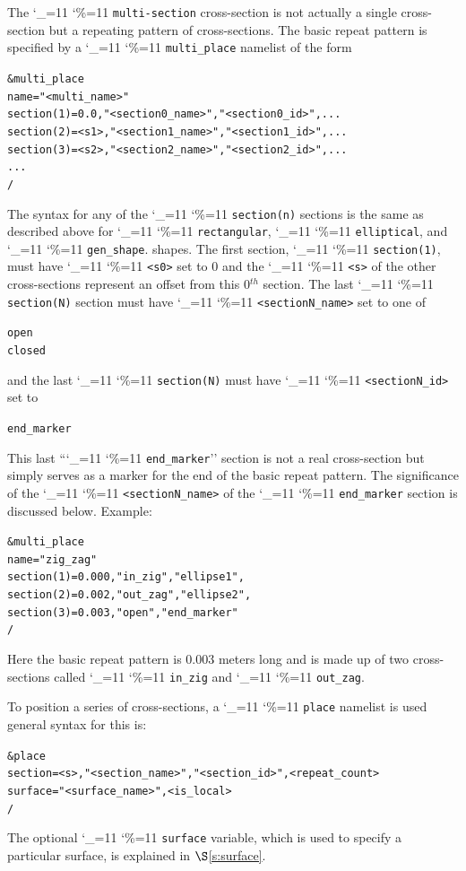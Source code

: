 \documentclass[11pt,openany]{report}
\newcommand{\sref}[1]{$\S$\ref{#1}}
\newcommand\ttcmd{\begingroup\catcode`\_=11 \catcode`\%=11 \dottcmd}
\newcommand\dottcmd[1]{\texttt{#1}\endgroup}
\newcommand{\vn}{\ttcmd}
\newcommand{\Th}{$^{th}$\xspace}
\newlength{\ExBeg}
\newlength{\ExEnd}
\newenvironment{example}
  {\vspace{\ExBeg} \begin{alltt}}
  {\end{alltt} \vspace{\ExEnd}}
\begin{document}
The \vn{multi-section} cross-section is not actually a single
cross-section but a repeating pattern of cross-sections. The basic
repeat pattern is specified by a \vn{multi_place} namelist of
the form
\begin{example}
  &multi_place
    name = "<multi_name>"
    section(1) = 0.0,  "<section0_name>", "<section0_id>", ...
    section(2) = <s1>, "<section1_name>", "<section1_id>", ...
    section(3) = <s2>, "<section2_name>", "<section2_id>", ...
    ...
  /
\end{example}
The syntax for any of the \vn{section(n)} sections is the same as
described above for \vn{rectangular}, \vn{elliptical}, and \vn{gen_shape}.
shapes. The first section, \vn{section(1)}, must
have \vn{<s0>} set to 0 and the \vn{<s>} of the other cross-sections
represent an offset from this 0\Th section. The last
\vn{section(N)} section must have \vn{<sectionN_name>} set to one of
\begin{example}
  open
  closed
\end{example}
and the last \vn{section(N)} must have \vn{<sectionN_id>} set to
\begin{example}
  end_marker
\end{example}
This last ``\vn{end_marker}'' section is not a real cross-section but
simply serves as a marker for the end of the basic repeat pattern. The
significance of the \vn{<sectionN_name>} of the \vn{end_marker} section is
discussed below. Example:
\begin{example}
  &multi_place
    name = "zig_zag"
    section(1) = 0.000, "in_zig",  "ellipse1",
    section(2) = 0.002, "out_zag", "ellipse2",
    section(3) = 0.003, "open",  "end_marker"
  /
\end{example}
Here the basic repeat pattern is 0.003 meters long and is made up of
two cross-sections called \vn{in_zig} and \vn{out_zag}.

To position a series of cross-sections, a \vn{place} namelist is used
general syntax for this is:
\begin{example}
  &place 
    section = <s>, "<section_name>", "<section_id>", <repeat_count> 
    surface = "<surface_name>", <is_local>
  /
\end{example} 
The optional \vn{surface} variable, which is used to specify a particular surface, is
explained in \sref{s:surface}.
\end{document}
